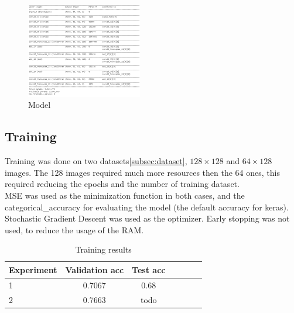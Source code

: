 \documentclass[twocolumn,showpacs,%
  nofootinbib,aps,superscriptaddress,%
  eqsecnum,prd,notitlepage,showkeys,10pt]{revtex4-1}
\begin{document}
\begin{figure}[H]
    \includegraphics[width=0.45\textwidth]{images/model.PNG}
    \caption{\label{fig:noise}Model}
\end{figure}
\subsection{Training}
Training was done on two datasets\ref{subsec:dataset}, $128\times128$ and $64\times128$ images. The 128 images required much more resources then the 64 ones, this required reducing the epochs and the number of training dataset.\\
MSE was used as the minimization function in both cases, and the categorical\_accuracy for evaluating the model (the default accuracy for keras).\\
Stochastic Gradient Descent was used as the optimizer. Early stopping was not used, to reduce the usage of the RAM.\\

\begin{table}[H] \label{tab:training}
    \centering
    \begin{tabular}{l|c|c|c|c|c|c}
    Experiment       &  Validation acc & Test acc \\\hline
    1          &  0.7067           & 0.68            \\\hline
    2          &  0.7663        &   todo  
    \end{tabular}
    \caption{\label{tab:widgets}Training results}
    \end{table}
\end{document}
